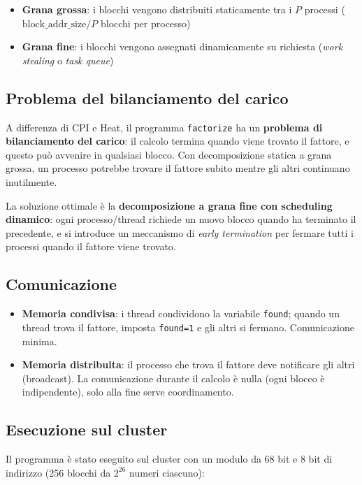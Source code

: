 \documentclass[a4paper,12pt]{article}
\begin{document}
\begin{itemize}
    \item \textbf{Grana grossa}: i blocchi vengono distribuiti staticamente tra i $P$ processi ($\text{block\_addr\_size}/P$ blocchi per processo)
    \item \textbf{Grana fine}: i blocchi vengono assegnati dinamicamente su richiesta (\textit{work stealing} o \textit{task queue})
\end{itemize}

\subsection{Problema del bilanciamento del carico}

A differenza di CPI e Heat, il programma \texttt{factorize} ha un \textbf{problema di bilanciamento del carico}: il calcolo termina quando viene trovato il fattore, e questo pu\`o avvenire in qualsiasi blocco. Con decomposizione statica a grana grossa, un processo potrebbe trovare il fattore subito mentre gli altri continuano inutilmente.

La soluzione ottimale \`e la \textbf{decomposizione a grana fine con scheduling dinamico}: ogni processo/thread richiede un nuovo blocco quando ha terminato il precedente, e si introduce un meccanismo di \textit{early termination} per fermare tutti i processi quando il fattore viene trovato.

\subsection{Comunicazione}

\begin{itemize}
    \item \textbf{Memoria condivisa}: i thread condividono la variabile \texttt{found}; quando un thread trova il fattore, imposta \texttt{found=1} e gli altri si fermano. Comunicazione minima.
    \item \textbf{Memoria distribuita}: il processo che trova il fattore deve notificare gli altri (broadcast). La comunicazione durante il calcolo \`e nulla (ogni blocco \`e indipendente), solo alla fine serve coordinamento.
\end{itemize}

\subsection{Esecuzione sul cluster}

Il programma \`e stato eseguito sul cluster con un modulo da 68 bit e 8 bit di indirizzo (256 blocchi da $2^{26}$ numeri ciascuno):
\end{document}
